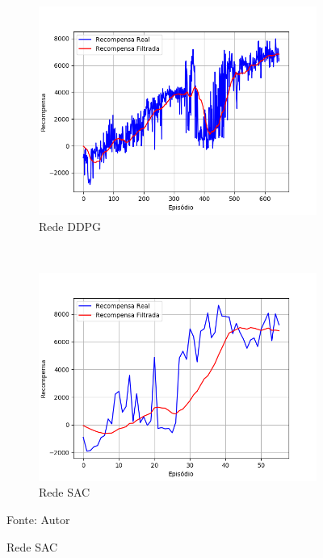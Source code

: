 \vspace{0.25cm}
\begin{figure}[H]
\caption{Recompensas do primeiro ambiente simulado}
    \begin{center}
    \begin{subfigure}[b]{0.48\textwidth}
        \includegraphics[width=\textwidth]{imagens/simulated_envs/ddpg_stage_1.png}
        \caption{Rede DDPG}
        \label{subfig:ddpg_stage_1}
    \end{subfigure}
    ~
    \begin{subfigure}[b]{0.48\textwidth}
        \includegraphics[width=\textwidth]{imagens/simulated_envs/sac_stage_1.png}
        \caption{Rede SAC}
        \label{subfig:sac_stage_1}
    \end{subfigure}
    \end{center}
    \label{fig:stage_1}
\small{Fonte: Autor}
\end{figure}

